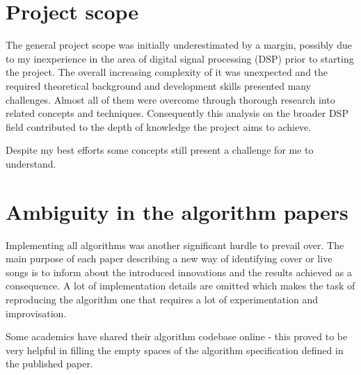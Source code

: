 \section{Project scope}
\label{sec:projectscope}

The general project scope was initially underestimated by a margin, possibly due
to my inexperience in the area of digital signal processing (DSP) prior to
starting the project. The overall increasing complexity of it was unexpected and
the required theoretical background and development skills presented many
challenges. Almost all of them were overcome through thorough research into
related concepts and techniques. Consequently this analysis on the broader DSP
field contributed to the depth of knowledge the project aims to achieve.

Despite my best efforts some concepts still present a challenge for me to
understand.

\section{Ambiguity in the algorithm papers} 
\label{sec:papersambiguity}

Implementing all algorithms was another significant hurdle to prevail over. The
main purpose of each paper describing a new way of identifying cover or live
songs is to inform about the introduced innovations and the results achieved as
a consequence. A lot of implementation details are omitted which makes the task
of reproducing the algorithm one that requires a lot of experimentation and
improvisation.

Some academics have shared their algorithm codebase online - this
proved to be very helpful in filling the empty spaces of the algorithm
specification defined in the published paper.

